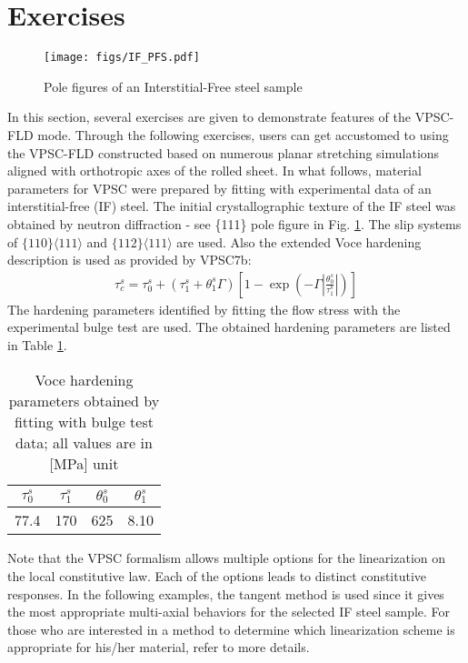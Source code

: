 \documentclass[12pt]{amsart}
\begin{document}
\section{Exercises}
\begin{figure}[b]
  \texttt{[image: figs/IF\_PFS.pdf]}%
  \caption{Pole figures of an Interstitial-Free steel sample}
  \label{fig:IF111}
\end{figure}
In this section, several exercises are given to demonstrate features of the VPSC-FLD mode.
Through the following exercises, users can get accustomed to using the VPSC-FLD constructed based on numerous planar stretching simulations aligned with orthotropic axes of the rolled sheet.
\newline
In what follows, material parameters for VPSC were prepared by fitting with experimental data of an interstitial-free (IF) steel.
The initial crystallographic texture of the IF steel was obtained by neutron diffraction - see \{111\} pole figure in Fig. \ref{fig:IF111}.
The slip systems of $\{110\}\langle111\rangle$ and $\{112\}\langle111\rangle$ are used.
Also the extended Voce hardening description is used as provided by VPSC7b:
\begin{eqnarray}
\tau_c^s=\tau_0^s+(\tau_1^s+\theta_1^s\Gamma)[1-\exp(-\Gamma|\frac{\theta_0^s}{\tau_1^s}|)]
  \label{eq:voce}
\end{eqnarray}
The hardening parameters identified by fitting the flow stress with the experimental bulge test are used.
The obtained hardening parameters are listed in Table \ref{tab:voce}.
\begin{table}[h]
  \caption{Voce hardening parameters obtained by fitting with bulge test data; all values are in [MPa] unit}
  \label{tab:voce}
  \begin{tabular}{ c | c | c | c}
    $\tau_0^s$ & $\tau_1^s$ & $\theta_0^s$ & $\theta_1^s$ \\
    \hline
    77.4 & 170 & 625 & 8.10
  \end{tabular}
\end{table}
\newline
Note that the VPSC formalism allows multiple options for the linearization on the local constitutive law.
Each of the options leads to distinct constitutive responses.
In the following examples, the tangent method is used since it gives the most appropriate multi-axial behaviors for the selected IF steel sample.
For those who are interested in a method to determine which linearization scheme is appropriate for his/her material, refer to \cite{jeong2012application} more details.
\end{document}
